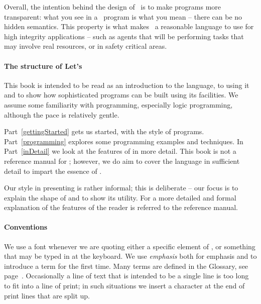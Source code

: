 Overall, the intention behind the design of \go\ is to make programs more transparent: what you see in a \go\ program is what you mean -- there can be no hidden semantics. This property is what makes \go\ a reasonable language to use for high integrity applications -- such as agents that will be performing tasks that may involve real resources, or in safety critical areas.

\paragraph{The structure of Let's \go}

This book is intended to be read as an introduction to the language, to using it and to show how sophisticated programs can be built using its facilities. We assume some familiarity with programming, especially logic programming, although the pace is relatively gentle.

Part~\ref{gettingStarted} gets us started, with the style of \go programs. Part~\ref{programming} explores some programming examples and techniques. In Part~\ref{inDetail} we look at the features of \go in more detail. This book is not a reference manual for \go; however, we do aim to cover the language in sufficient detail to impart the essence of \go.

Our style in presenting \go is rather informal; this is deliberate -- our focus is to explain the shape of \go and to show its utility. For a more detailed and formal explanation of the features of \go the reader is referred to the \go reference manual.


\paragraph{Conventions}
We use a  font whenever we are quoting either a specific element of \go, or something that may be typed in at the keyboard. We use \emph{emphasis} both for emphasis and to introduce a term for the first time. Many terms are defined in the Glossary, see page~\pageref{glossary}. Occasionally a line of text that is intended to be a single line is too long to fit into a line of print; in such situations we insert a \return character at the end of print lines that are split up.

